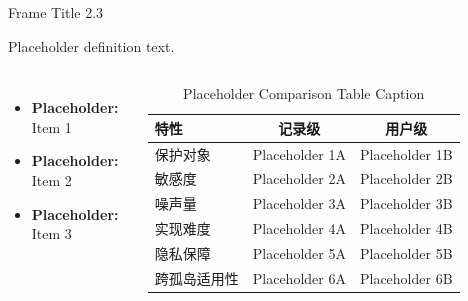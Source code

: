 \documentclass{beamer}
\begin{document}
\begin{frame}{Frame Title 2.3} %
    \begin{definition}
        Placeholder definition text.
    \end{definition}

    \begin{columns}[T]
        \begin{itemize}
            \item \textbf{Placeholder:} Item 1
            \item \textbf{Placeholder:} Item 2
            \item \textbf{Placeholder:} Item 3
        \end{itemize}

        \begin{table}
            \caption{\tiny Placeholder Comparison Table Caption}
            \centering \tiny
            \begin{tabular}{lcc}
                \toprule
                \textbf{特性} & \textbf{记录级} & \textbf{用户级} \\
                \midrule
                保护对象 & Placeholder 1A & Placeholder 1B \\
                敏感度 & Placeholder 2A & Placeholder 2B \\
                噪声量 & Placeholder 3A & Placeholder 3B \\
                实现难度 & Placeholder 4A & Placeholder 4B \\
                隐私保障 & Placeholder 5A & Placeholder 5B \\
                跨孤岛适用性 & Placeholder 6A & Placeholder 6B \\
                \bottomrule
            \end{tabular}
        \end{table}
    \end{columns}
\end{frame}
\end{document}
